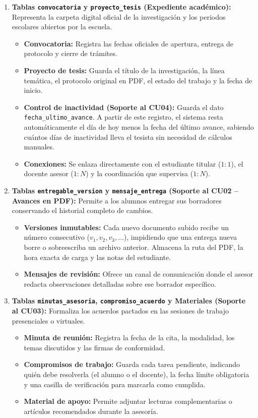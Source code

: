 \begin{enumerate}
    \item \textbf{Tablas \texttt{convocatoria} y \texttt{proyecto\_tesis} (Expediente académico):}
    Representa la carpeta digital oficial de la investigación y los periodos escolares abiertos por la escuela.
    \begin{itemize}
        \item \textbf{Convocatoria:} Registra las fechas oficiales de apertura, entrega de protocolo y cierre de trámites.
        \item \textbf{Proyecto de tesis:} Guarda el título de la investigación, la línea temática, el protocolo original en PDF, el estado del trabajo y la fecha de inicio.
        \item \textbf{Control de inactividad (Soporte al CU04):} Guarda el dato \texttt{fecha\_ultimo\_avance}. A partir de este registro, el sistema resta automáticamente el día de hoy menos la fecha del último avance, sabiendo cuántos días de inactividad lleva el tesista sin necesidad de cálculos manuales.
        \item \textbf{Conexiones:} Se enlaza directamente con el estudiante titular ($1:1$), el docente asesor ($1:N$) y la coordinación que supervisa ($1:N$).
    \end{itemize}

    \item \textbf{Tablas \texttt{entregable\_version} y \texttt{mensaje\_entrega} (Soporte al CU02 -- Avances en PDF):}
    Permite a los alumnos entregar sus borradores conservando el historial completo de cambios.
    \begin{itemize}
        \item \textbf{Versiones inmutables:} Cada nuevo documento subido recibe un número consecutivo ($v_1, v_2, v_3, \dots$), impidiendo que una entrega nueva borre o sobreescriba un archivo anterior. Almacena la ruta del PDF, la hora exacta de carga y las notas del estudiante.
        \item \textbf{Mensajes de revisión:} Ofrece un canal de comunicación donde el asesor redacta observaciones detalladas sobre ese borrador específico.
    \end{itemize}

    \item \textbf{Tablas \texttt{minutas\_asesoria}, \texttt{compromiso\_acuerdo} y Materiales (Soporte al CU03):}
    Formaliza los acuerdos pactados en las sesiones de trabajo presenciales o virtuales.
    \begin{itemize}
        \item \textbf{Minuta de reunión:} Registra la fecha de la cita, la modalidad, los temas discutidos y las firmas de conformidad.
        \item \textbf{Compromisos de trabajo:} Guarda cada tarea pendiente, indicando quién debe resolverla (el alumno o el docente), la fecha límite obligatoria y una casilla de verificación para marcarla como cumplida.
        \item \textbf{Material de apoyo:} Permite adjuntar lecturas complementarias o artículos recomendados durante la asesoría.
    \end{itemize}


\end{enumerate}

